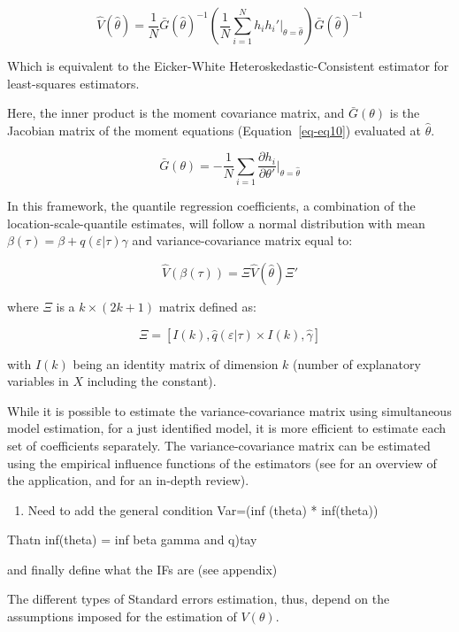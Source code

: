 \documentclass[
  authoryear,
  preprint,
  1p]{elsarticle}
\providecommand{\tightlist}{%
  \setlength{\itemsep}{0pt}\setlength{\parskip}{0pt}}\usepackage{longtable,booktabs,array}
\begin{document}
\[
\hat{V}(\hat\theta)=\frac{1}{N} 
\bar G(\hat\theta)^{-1} 
\left( \frac{1}{N} \sum_{i=1}^N h_i h_i'  \Big|_{\theta=\hat\theta} \right) 
\bar G(\hat\theta)^{-1} 
\]

Which is equivalent to the Eicker-White Heteroskedastic-Consistent
estimator for least-squares estimators.

Here, the inner product is the moment covariance matrix, and
\(\bar{G}(\theta)\) is the Jacobian matrix of the moment equations
(Equation~\ref{eq-eq10}) evaluated at \(\hat\theta\).

\[\bar{G}(\theta) =-\frac{1}{N} \sum_{i=1} \frac{\partial h_i}{\partial \theta'} \Big|_{\theta=\hat\theta}\]

In this framework, the quantile regression coefficients, a combination
of the location-scale-quantile estimates, will follow a normal
distribution with mean \(\beta(\tau) = \beta+q(\varepsilon|\tau)\gamma\)
and variance-covariance matrix equal to:

\[\hat{V}(\beta(\tau)) = \Xi \hat{V}(\hat\theta) \Xi'
\]

where \(\Xi\) is a \(k \times (2k+1)\) matrix defined as:

\[\Xi = [ I(k), \hat q(\varepsilon|\tau) \times I(k), \hat \gamma ]
\]

with \(I(k)\) being an identity matrix of dimension \(k\) (number of
explanatory variables in \(X\) including the constant).

While it is possible to estimate the variance-covariance matrix using
simultaneous model estimation, for a just identified model, it is more
efficient to estimate each set of coefficients separately. The
variance-covariance matrix can be estimated using the empirical
influence functions of the estimators (see \citet{jann_2020} for an
overview of the application, and \citet{hampel2005} for an in-depth
review).

\begin{enumerate}
\def\labelenumi{\arabic{enumi}.}
\tightlist
\item
  Need to add the general condition Var=(inf (theta) * inf(theta))
\end{enumerate}

Thatn inf(theta) = inf beta gamma and q)tay

and finally define what the IFs are (see appendix)

The different types of Standard errors estimation, thus, depend on the
assumptions imposed for the estimation of \(V(\theta)\).
\end{document}
